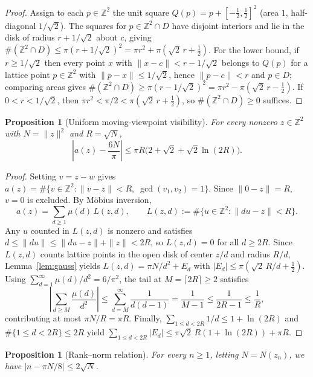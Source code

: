 \documentclass[11pt]{article}
\newtheorem{proposition}[theorem]{Proposition}
\begin{document}
\begin{proof}
Assign to each $p \in \mathbb{Z}^2$ the unit square
$Q(p) = p + [-\tfrac{1}{2}, \tfrac{1}{2}]^2$ (area $1$, half-diagonal $1/\sqrt{2}$).
The squares for $p \in \mathbb{Z}^2 \cap D$ have disjoint interiors and lie in
the disk of radius $r + 1/\sqrt{2}$ about $c$, giving
$\#(\mathbb{Z}^2 \cap D) \le \pi(r + 1/\sqrt{2})^2 = \pi r^2 + \pi(\sqrt{2}\,r + \tfrac{1}{2})$.
For the lower bound, if $r \ge 1/\sqrt{2}$ then every point $x$ with
$\|x - c\| < r - 1/\sqrt{2}$ belongs to $Q(p)$ for a lattice point
$p \in \mathbb{Z}^2$ with $\|p - x\| \le 1/\sqrt{2}$, hence $\|p - c\| < r$ and
$p \in D$; comparing areas gives
$\#(\mathbb{Z}^2 \cap D) \ge \pi(r - 1/\sqrt{2})^2 = \pi r^2 - \pi(\sqrt{2}\,r - \tfrac{1}{2})$.
If $0 < r < 1/\sqrt{2}$, then $\pi r^2 < \pi/2 < \pi(\sqrt{2}\,r + \tfrac{1}{2})$,
so $\#(\mathbb{Z}^2 \cap D) \ge 0$ suffices.
\end{proof}

\begin{proposition}[Uniform moving-viewpoint visibility]\label{prop:vis}
For every nonzero $z \in \mathbb{Z}^2$ with $N = \|z\|^2$ and $R = \sqrt{N}$,
\[
\left|a(z) - \frac{6N}{\pi}\right| \le \pi R\bigl(2 + \sqrt{2} + \sqrt{2}\ln(2R)\bigr).
\]
\end{proposition}

\begin{proof}
Setting $v = z - w$ gives $a(z) = \#\{v \in \mathbb{Z}^2 : \|v - z\| < R,\; \gcd(v_1, v_2) = 1\}$.
Since $\|0 - z\| = R$, $v = 0$ is excluded. By M\"obius inversion,
\[
a(z) = \sum_{d \ge 1} \mu(d)\, L(z, d),
\qquad
L(z, d) := \#\{u \in \mathbb{Z}^2 : \|du - z\| < R\}.
\]
Any $u$ counted in $L(z, d)$ is nonzero and satisfies
$d \le \|du\| \le \|du - z\| + \|z\| < 2R$, so $L(z, d) = 0$ for all $d \ge 2R$.
Since $L(z, d)$ counts lattice points in the open disk of center $z/d$ and
radius $R/d$, Lemma~\ref{lem:gauss} yields
$L(z, d) = \pi N / d^2 + E_d$ with $|E_d| \le \pi(\sqrt{2}\,R/d + \tfrac{1}{2})$.
Using $\sum_{d=1}^{\infty} \mu(d)/d^2 = 6/\pi^2$, the tail at $M = \lceil 2R \rceil \ge 2$
satisfies
\[
\left|\sum_{d \ge M} \frac{\mu(d)}{d^2}\right|
\le \sum_{d = M}^{\infty} \frac{1}{d(d - 1)} = \frac{1}{M - 1} \le \frac{1}{2R - 1} \le \frac{1}{R},
\]
contributing at most $\pi N / R = \pi R$. Finally, $\sum_{1 \le d < 2R} 1/d \le 1 + \ln(2R)$
and $\#\{1 \le d < 2R\} \le 2R$ yield
$\sum_{1 \le d < 2R} |E_d| \le \pi\sqrt{2}\,R(1 + \ln(2R)) + \pi R$.
\end{proof}

\begin{proposition}[Rank--norm relation]\label{prop:rank}
For every $n \ge 1$, letting $N = N(z_n)$, we have $|n - \pi N / 8| \le 2\sqrt{N}$.
\end{proposition}
\end{document}
